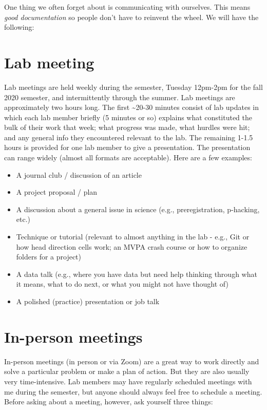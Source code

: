 \documentclass[
  12pt,
]{book}
\begin{document}
One thing we often forget about is communicating with ourselves. This means \emph{good documentation} so people don't have to reinvent the wheel. We will have the following:

\hypertarget{lab-meeting}{%
\section{Lab meeting}\label{lab-meeting}}

Lab meetings are held weekly during the semester, Tuesday 12pm-2pm for the fall 2020 semester, and intermittently through the summer. Lab meetings are approximately two hours long. The first \textasciitilde20-30 minutes consist of lab updates in which each lab member briefly (5 minutes or so) explains what constituted the bulk of their work that week; what progress was made, what hurdles were hit; and any general info they encountered relevant to the lab. The remaining 1-1.5 hours is provided for one lab member to give a presentation. The presentation can range widely (almost all formats are acceptable). Here are a few examples:

\begin{itemize}
\item
  A journal club / discussion of an article
\item
  A project proposal / plan
\item
  A discussion about a general issue in science (e.g., preregistration, p-hacking, etc.)
\item
  Technique or tutorial (relevant to almost anything in the lab - e.g., Git or how head direction cells work; an MVPA crash course or how to organize folders for a project)
\item
  A data talk (e.g., where you have data but need help thinking through what it means, what to do next, or what you might not have thought of)
\item
  A polished (practice) presentation or job talk
\end{itemize}

\hypertarget{in-person-meetings}{%
\section{In-person meetings}\label{in-person-meetings}}

In-person meetings (in person or via Zoom) are a great way to work directly and solve a particular problem or make a plan of action. But they are also usually very time-intensive. Lab members may have regularly scheduled meetings with me during the semester, but anyone should always feel free to schedule a meeting. Before asking about a meeting, however, ask yourself three things:
\end{document}
